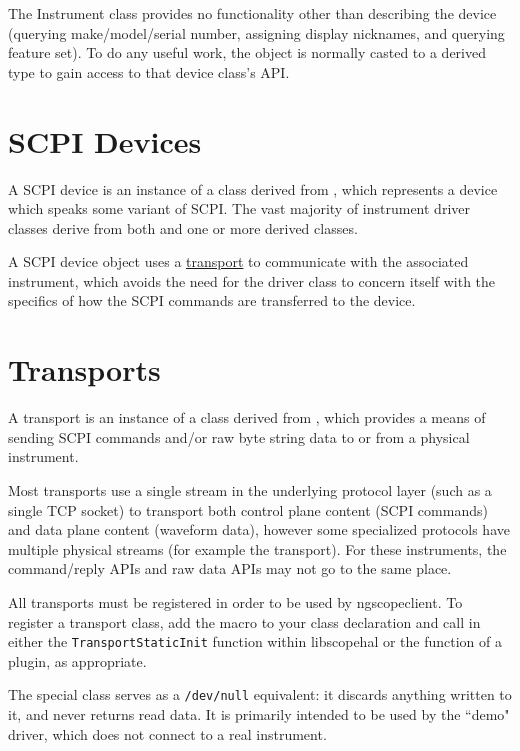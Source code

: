 The Instrument class provides no functionality other than describing the device (querying make/model/serial number,
assigning display nicknames, and querying feature set). To do any useful work, the object is normally casted to a
derived type to gain access to that device class's API.

\section{SCPI Devices}
\label{sec:scpidevices}

A SCPI device is an instance of a class derived from , which represents a device which speaks
some variant of SCPI. The vast majority of instrument driver classes derive from both  and one or
more  derived classes.

A SCPI device object uses a \hyperref[sec:transports]{transport} to communicate with the associated instrument, which
avoids the need for the driver class to concern itself with the specifics of how the SCPI commands are transferred to
the device.

\section{Transports}
\label{sec:transports}

A transport is an instance of a class derived from , which provides a means of sending SCPI
commands and/or raw byte string data to or from a physical instrument.

Most transports use a single stream in the underlying protocol layer (such as a single TCP socket) to transport both
control plane content (SCPI commands) and data plane content (waveform data), however some specialized protocols have
multiple physical streams (for example the  transport). For these instruments, the
command/reply APIs and raw data APIs may not go to the same place.

All transports must be registered in order to be used by ngscopeclient. To register a transport class, add the macro
 to your class declaration and call
 in either the \texttt{TransportStaticInit} function within libscopehal or
the  function of a plugin, as appropriate.

The special class  serves as a \texttt{/dev/null} equivalent: it discards anything written
to it, and never returns read data. It is primarily intended to be used by the ``demo" driver, which does not connect
to a real instrument.

